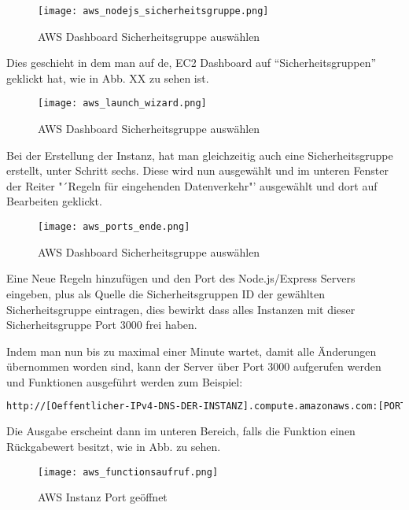 \begin{center}
\begin{figure}[h]
    \centering
    \texttt{[image: aws\_nodejs\_sicherheitsgruppe.png]}
    \caption{AWS Dashboard Sicherheitsgruppe auswählen}
\end{figure}
\end{center}

Dies geschieht in dem man auf de, EC2 Dashboard auf "`Sicherheitsgruppen"' geklickt hat, wie in Abb. XX zu sehen ist. 

\begin{center}
\begin{figure}[h]
    \centering
    \texttt{[image: aws\_launch\_wizard.png]}
    \caption{AWS Dashboard Sicherheitsgruppe auswählen}
\end{figure}
\end{center}

Bei der Erstellung der Instanz, hat man gleichzeitig auch eine Sicherheitsgruppe erstellt, unter Schritt sechs. Diese wird nun ausgewählt und im unteren Fenster der Reiter "´Regeln für eingehenden Datenverkehr"' ausgewählt und dort auf Bearbeiten geklickt.


\begin{center}
\begin{figure}[h]
    \centering
    \texttt{[image: aws\_ports\_ende.png]}
    \caption{AWS Dashboard Sicherheitsgruppe auswählen}
\end{figure}
\end{center}

Eine Neue Regeln hinzufügen und den Port des Node.js/Express Servers eingeben, plus als Quelle die Sicherheitsgruppen ID der gewählten Sicherheitsgruppe eintragen, dies bewirkt dass alles Instanzen mit dieser Sicherheitsgruppe Port 3000 frei haben.

Indem man nun bis zu maximal einer Minute wartet, damit alle Änderungen übernommen worden sind, kann der Server über Port 3000 aufgerufen werden und Funktionen ausgeführt werden zum Beispiel:

\begin{lstlisting}[language=bash]
http://[Oeffentlicher-IPv4-DNS-DER-INSTANZ].compute.amazonaws.com:[PORTNUMMER]/[FUNKTIONS_NAME]
\end{lstlisting}

Die Ausgabe erscheint dann im unteren Bereich, falls die Funktion einen Rückgabewert besitzt, wie in Abb. zu sehen.

\begin{center}
\begin{figure}[h]
    \centering
    \texttt{[image: aws\_functionsaufruf.png]}
    \caption{AWS Instanz Port geöffnet}
\end{figure}
\end{center}

